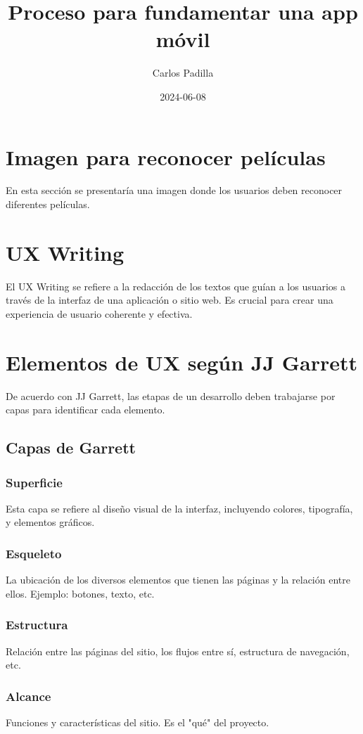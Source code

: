 \documentclass{article}
\title{Proceso para fundamentar una app móvil}
\author{Carlos Padilla}
\date{2024-06-08}
\begin{document}
\maketitle

\section{Imagen para reconocer películas}
En esta sección se presentaría una imagen donde los usuarios deben reconocer diferentes películas. 

\section{UX Writing}
El UX Writing se refiere a la redacción de los textos que guían a los usuarios a través de la interfaz de una aplicación o sitio web. Es crucial para crear una experiencia de usuario coherente y efectiva.

\section{Elementos de UX según JJ Garrett}
De acuerdo con JJ Garrett, las etapas de un desarrollo deben trabajarse por capas para identificar cada elemento.

\subsection{Capas de Garrett}

\subsubsection{Superficie}
Esta capa se refiere al diseño visual de la interfaz, incluyendo colores, tipografía, y elementos gráficos.

\subsubsection{Esqueleto}
La ubicación de los diversos elementos que tienen las páginas y la relación entre ellos. Ejemplo: botones, texto, etc.

\subsubsection{Estructura}
Relación entre las páginas del sitio, los flujos entre sí, estructura de navegación, etc.

\subsubsection{Alcance}
Funciones y características del sitio. Es el "qué" del proyecto.
\end{document}
